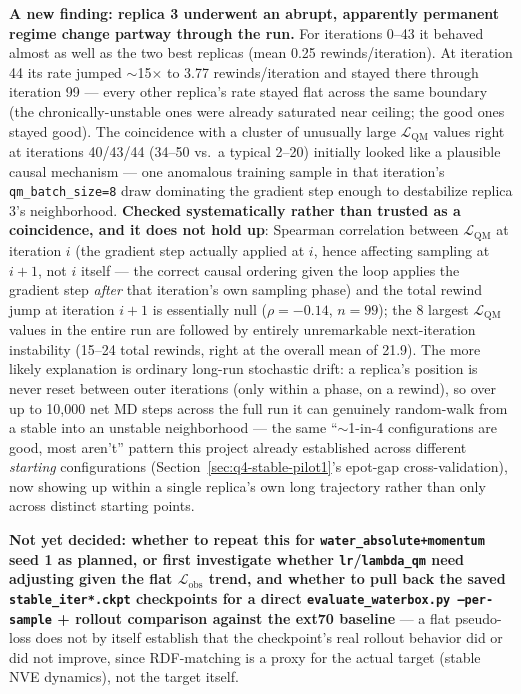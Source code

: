 \documentclass[11pt]{article}
\begin{document}
\textbf{A new finding: replica 3 underwent an abrupt, apparently permanent
regime change partway through the run.} For iterations 0--43 it behaved
almost as well as the two best replicas (mean 0.25 rewinds/iteration). At
iteration 44 its rate jumped $\sim$15$\times$ to 3.77 rewinds/iteration and
stayed there through iteration 99 --- every other replica's rate stayed
flat across the same boundary (the chronically-unstable ones were already
saturated near ceiling; the good ones stayed good). The coincidence with a
cluster of unusually large $\mathcal{L}_{\text{QM}}$ values right at
iterations 40/43/44 (34--50 vs.\ a typical 2--20) initially looked like a
plausible causal mechanism --- one anomalous training sample in that
iteration's \texttt{qm\_batch\_size=8} draw dominating the gradient step
enough to destabilize replica 3's neighborhood. \textbf{Checked
systematically rather than trusted as a coincidence, and it does not hold
up}: Spearman correlation between $\mathcal{L}_{\text{QM}}$ at iteration
$i$ (the gradient step actually applied at $i$, hence affecting sampling
at $i+1$, not $i$ itself --- the correct causal ordering given the loop
applies the gradient step \emph{after} that iteration's own sampling phase)
and the total rewind jump at iteration $i+1$ is essentially null
($\rho=-0.14$, $n=99$); the 8 largest $\mathcal{L}_{\text{QM}}$ values in
the entire run are followed by entirely unremarkable next-iteration
instability (15--24 total rewinds, right at the overall mean of 21.9). The
more likely explanation is ordinary long-run stochastic drift: a
replica's position is never reset between outer iterations (only within a
phase, on a rewind), so over up to 10{,}000 net MD steps across the full
run it can genuinely random-walk from a stable into an unstable
neighborhood --- the same ``$\sim$1-in-4 configurations are good, most
aren't'' pattern this project already established across different
\emph{starting} configurations (Section~\ref{sec:q4-stable-pilot1}'s
epot-gap cross-validation), now showing up within a single replica's own
long trajectory rather than only across distinct starting points.

\textbf{Not yet decided: whether to repeat this for
\texttt{water\_absolute+momentum} seed 1 as planned, or first investigate
whether \texttt{lr}/\texttt{lambda\_qm} need adjusting given the flat
$\mathcal{L}_{\text{obs}}$ trend, and whether to pull back the saved
\texttt{stable\_iter*.ckpt} checkpoints for a direct
\texttt{evaluate\_waterbox.py --per-sample} + rollout comparison against
the ext70 baseline} --- a flat pseudo-loss does not by itself establish
that the checkpoint's real rollout behavior did or did not improve, since
RDF-matching is a proxy for the actual target (stable NVE dynamics), not
the target itself.
\end{document}
